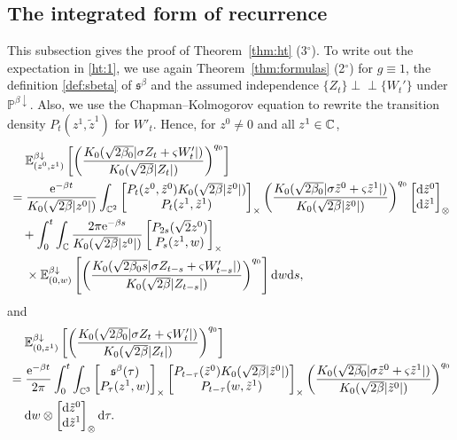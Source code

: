 \documentclass[12pt, twoside]{article}
\numberwithin{figure}{section}
\newcommand{\e}{{\mathrm e}}
\newcommand{\1}{\mathds 1}
\newcommand{\da}{{\downarrow}}
\newcommand{\ind}{{\perp\!\!\!\perp}}
\renewcommand{\P}{{\mathbb P}}
\newcommand{\E}{{\mathbb E}}
\renewcommand{\d}{{\mathrm d}}
\newcommand{\2}{{\mathbf 1}}
\newcommand{\s}{{\mathfrak s}}
\newcommand{\cc}{{^\circ}}
\newcommand{\two}{{\sqrt{2}}}
\begin{document}
\subsection{The integrated form of recurrence}\label{sec:ht2}
This subsection gives the proof of Theorem~\ref{thm:ht} (3$\cc$). To write out the expectation in \eqref{ht:1},
we use again Theorem~\ref{thm:formulas} (2$\cc$)  for $g\equiv 1$, the definition \eqref{def:sbeta} of $\s^\beta$ and the assumed independence $\{Z_t\}\ind \{W_t'\}$ under $\P^{\beta\da}$. Also, we use the Chapman--Kolmogorov equation to rewrite the transition density $P_t(z^1,\tilde{z}^1)$ for $W'_t$. Hence, for $z^0\neq 0$ and all $z^1\in \Bbb C$,
\begin{align*}
&\quad\;\E^{\beta\da}_{(z^0,z^1)}\left[\left(\frac{K_0(\sqrt{2\beta_0}|\sigma Z_t+\varsigma W'_t|)}{K_0(\sqrt{2\beta}|Z_t|)}\right)^{q_0}\right]\\
&=
\displaystyle 
\frac{\e^{-\beta t}}{K_0(\sqrt{2\beta}|z^0|)}
\int_{\Bbb C^2}
\begin{bmatrix}
P_t(z^0,\tilde{z}^0) K_0(\sqrt{2\beta}|\tilde{z}^0|)\\
P_t(z^1,\tilde{z}^1)
\end{bmatrix}_\times
\left(\frac{K_0(\sqrt{2\beta_0}|\sigma \tilde{z}^0+\varsigma \tilde{z}^1|)}{K_0(\sqrt{2\beta}|\tilde{z}^0|)}\right)^{q_0}\begin{bmatrix}
\d \tilde{z}^0\\
\d \tilde{z}^1
\end{bmatrix}_\otimes\\
&\quad +\int_0^{t}\int_{\Bbb C} 
\frac{2\pi \e^{-\beta s}}{K_0(\sqrt{2\beta}|z^0|)}
\begin{bmatrix}
P_{2s}(\two z^0)\\
P_{s}(z^1,w)
\end{bmatrix}_\times\\
&\quad\;\times \E^{\beta\da}_{(0,w)}\left[\left(\frac{K_0(\sqrt{2\beta_0s}|\sigma Z_{t-s}+\varsigma W'_{t-s}|)}{K_0(\sqrt{2\beta}|Z_{t-s}|)}\right)^{q_0}\right]\d w \d s,
\end{align*}
and
\begin{align*}
&\quad\;\E^{\beta\da}_{(0,z^1)}\left[\left(\frac{K_0(\sqrt{2\beta_0}|\sigma Z_t+\varsigma W'_t|)}{K_0(\sqrt{2\beta}|Z_t|)}\right)^{q_0}\right]\\
&= \frac{\e^{-\beta t}}{2\pi}\int_0^t \int_{\Bbb C^3}
\begin{bmatrix}
\s^\beta(\tau)\\
P_{\tau}(z^1,w)
\end{bmatrix}_\times 
\begin{bmatrix}
P_{t-\tau}(\tilde{z}^0)K_0(\sqrt{2\beta}|\tilde{z}^0|)\\
P_{t-\tau}(w,\tilde{z}^1)
\end{bmatrix}_\times 
\left(\frac{K_0(\sqrt{2\beta_0}|\sigma \tilde{z}^0+\varsigma \tilde{z}^1|)}{K_0(\sqrt{2\beta}|\tilde{z}^0|)}\right)^{q_0}\\
&\quad \;\d w\otimes \begin{bmatrix}
\d \tilde{z}^0\\
\d \tilde{z}^1
\end{bmatrix}_\otimes \d \tau.
\end{align*}
\end{document}

